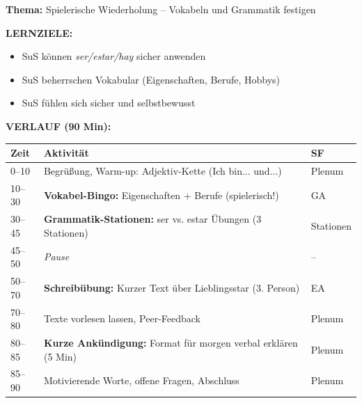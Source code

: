 \documentclass[11pt, a4paper]{article}
\newcommand{\es}[1]{\textcolor{spanisch}{\textit{#1}}}
\begin{document}
\begin{dsbox}[title={DS 9 -- Repaso: Vocabulario y Gramática (Mo, 02.02.2026)}]

\textbf{Thema:} Spielerische Wiederholung -- Vokabeln und Grammatik festigen

\vspace{0.3cm}


\vspace{0.3cm}

\textbf{LERNZIELE:}
\begin{itemize}[leftmargin=1.5em, nosep]
    \item[Alle:] SuS können \es{ser/estar/hay} sicher anwenden
    \item[Alle:] SuS beherrschen Vokabular (Eigenschaften, Berufe, Hobbys)
    \item[Alle:] SuS fühlen sich sicher und selbstbewusst
\end{itemize}

\vspace{0.2cm}

\textbf{VERLAUF (90 Min):}

\begin{tabular}{|p{1.2cm}|p{9cm}|p{3.5cm}|}
\hline
\rowcolor{hellgrau}
\textbf{Zeit} & \textbf{Aktivität} & \textbf{SF} \\
\hline
0--10 & Begrüßung, Warm-up: Adjektiv-Kette (Ich bin... und...) & Plenum \\
\hline
10--30 & \textbf{Vokabel-Bingo:} Eigenschaften + Berufe (spielerisch!) & GA \\
\hline
30--45 & \textbf{Grammatik-Stationen:} ser vs. estar Übungen (3 Stationen) & Stationen \\
\hline
45--50 & \textit{Pause} & -- \\
\hline
50--70 & \textbf{Schreibübung:} Kurzer Text über Lieblingsstar (3. Person) & EA \\
\hline
70--80 & Texte vorlesen lassen, Peer-Feedback & Plenum \\
\hline
80--85 & \textbf{Kurze Ankündigung:} Format für morgen verbal erklären (5 Min) & Plenum \\
\hline
85--90 & Motivierende Worte, offene Fragen, Abschluss & Plenum \\
\hline
\end{tabular}


\end{dsbox}
\end{document}
